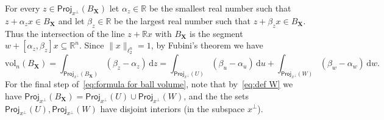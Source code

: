 \documentclass[11pt,reqno]{amsart}
\newcommand{\ud}[0]{\,\mathrm{d}}
\newcommand{\proj}{\mathsf{Proj}}
\newcommand{\X}{\mathbf X}
\newcommand{\R}{\mathbb R}
\theoremstyle{remark}
\renewcommand{\subset}{\subseteq}
\newcommand{\vol}{\mathrm{vol}}
\renewcommand{\1}{\mathbf 1}
\begin{document}
For every $z\in \proj_{x^{\perp}} (B_{\X})$ let $\alpha_z\in \R$ be the smallest real number such that $z+\alpha_zx\in B_{\X}$ and let $\beta_z\in \R$ be the largest real number such that $z+\beta_z x\in B_{\X}$. Thus the intersection of the line $z+\R x$ with $B_{\X}$ is the segment $w+[\alpha_z,\beta_z]x\subset \R^n$. Since $\|x\|_{\ell_2^n}=1$, by Fubini's theorem we have
\begin{equation}\label{eq:formula for ball volume}
 \vol_n(B_{\X})=\int_{\proj_{x^{\perp}} (B_{\X})} (\beta_z-\alpha_z)\ud z=
\int_{\proj_{x^{\perp}} (U)} (\beta_u-\alpha_u)\ud u+\int_{\proj_{x^{\perp}} (W)} (\beta_w-\alpha_w)\ud w.
\end{equation}
For the final step of~\eqref{eq:formula for ball volume}, note that by~\eqref{eq:def W} we have $\proj_{x^{\perp}} (B_{\X})=\proj_{x^{\perp}} (U) \cup \proj_{x^{\perp}} (W)$, and the the sets $\proj_{x^{\perp}} (U),\proj_{x^{\perp}} (W)$ have disjoint interiors (in the subspace $x^\perp$).
\end{document}
